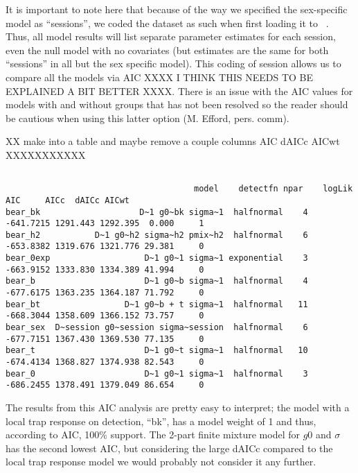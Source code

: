 It is important to note here that because of the way we specified the sex-specific model
as  ``sessions'', we 
coded the dataset as such when first loading it to \secr~.  
Thus, all model results will list separate parameter estimates for each session, even the null model with no covariates (but estimates are the same for both ``sessions'' in all but the sex specific model). This
coding of session allows us to compare all the models via AIC XXXX I THINK THIS NEEDS TO BE EXPLAINED A BIT BETTER XXXX.  There
is an issue with the AIC values for models with and without groups
that has not been resolved so the reader should be cautious when using
this latter option (M. Efford, pers. comm).


   XX make into a table and maybe remove a couple columns AIC dAICc AICwt XXXXXXXXXXX

{\small
\begin{verbatim}

                                      model    detectfn npar    logLik      AIC     AICc  dAICc AICwt
bear_bk                    D~1 g0~bk sigma~1  halfnormal    4 -641.7215 1291.443 1292.395  0.000     1
bear_h2           D~1 g0~h2 sigma~h2 pmix~h2  halfnormal    6 -653.8382 1319.676 1321.776 29.381     0
bear_0exp                   D~1 g0~1 sigma~1 exponential    3 -663.9152 1333.830 1334.389 41.994     0
bear_b                      D~1 g0~b sigma~1  halfnormal    4 -677.6175 1363.235 1364.187 71.792     0
bear_bt                 D~1 g0~b + t sigma~1  halfnormal   11 -668.3044 1358.609 1366.152 73.757     0
bear_sex  D~session g0~session sigma~session  halfnormal    6 -677.7151 1367.430 1369.530 77.135     0
bear_t                      D~1 g0~t sigma~1  halfnormal   10 -674.4134 1368.827 1374.938 82.543     0
bear_0                      D~1 g0~1 sigma~1  halfnormal    3 -686.2455 1378.491 1379.049 86.654     0

\end{verbatim}
}

The results from this AIC analysis are pretty easy to interpret; the model
with a local trap response on detection, ``bk'', has a model weight of 1 and thus, according to AIC, 100\% support.
The 2-part finite mixture model for $g0$ and $\sigma$ has the second lowest
AIC, but considering the large dAICc compared to the local trap response model we would probably not consider it any further.  




